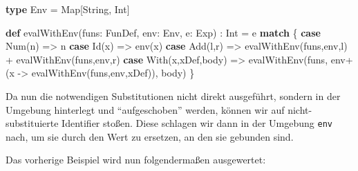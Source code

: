 \documentclass[]{article}
\newenvironment{Shaded}{}{}
\newcommand{\FunctionTok}[1]{\textcolor[rgb]{0.02,0.16,0.49}{#1}}
\newcommand{\KeywordTok}[1]{\textcolor[rgb]{0.00,0.44,0.13}{\textbf{#1}}}
\newcommand{\NormalTok}[1]{#1}
\begin{document}
\begin{Shaded}
\begin{Highlighting}[]
\KeywordTok{type}\NormalTok{ Env = Map[String, Int]}

\KeywordTok{def} \FunctionTok{evalWithEnv}\NormalTok{(funs: FunDef, env: Env, e: Exp) : Int = e }\KeywordTok{match}\NormalTok{ \{}
  \KeywordTok{case} \FunctionTok{Num}\NormalTok{(n) =\textgreater{} n}
  \KeywordTok{case} \FunctionTok{Id}\NormalTok{(x) =\textgreater{} }\FunctionTok{env}\NormalTok{(x)}
  \KeywordTok{case} \FunctionTok{Add}\NormalTok{(l,r) =\textgreater{} }\FunctionTok{evalWithEnv}\NormalTok{(funs,env,l) + }\FunctionTok{evalWithEnv}\NormalTok{(funs,env,r)}
  \KeywordTok{case} \FunctionTok{With}\NormalTok{(x,xDef,body) =\textgreater{} }
    \FunctionTok{evalWithEnv}\NormalTok{(funs, env+(x {-}\textgreater{} }\FunctionTok{evalWithEnv}\NormalTok{(funs,env,xDef)), body)}
\NormalTok{\}}
\end{Highlighting}
\end{Shaded}

Da nun die notwendigen Substitutionen nicht direkt ausgeführt, sondern
in der Umgebung hinterlegt und ``aufgeschoben'' werden, können wir auf
nicht-substituierte Identifier stoßen. Diese schlagen wir dann in der
Umgebung \texttt{env} nach, um sie durch den Wert zu ersetzen, an den
sie gebunden sind.

Das vorherige Beispiel wird nun folgendermaßen ausgewertet:
\end{document}
